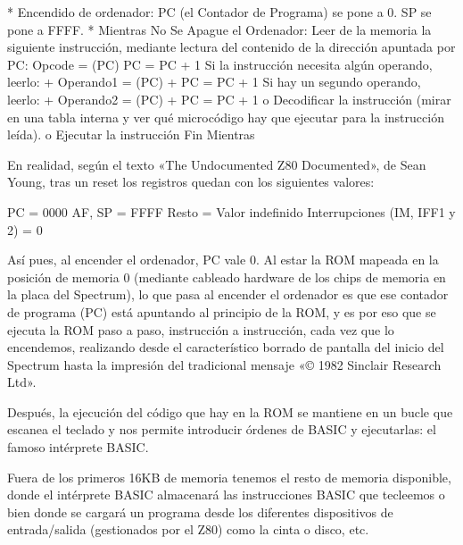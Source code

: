 \documentclass[letterpaper,10pt,spanish]{sphinxmanual}
\begin{document}
\begin{sphinxVerbatim}[commandchars=\\\{\}]
* Encendido de ordenador:
    \PYGZhy{} PC (el Contador de Programa) se pone a 0.
    \PYGZhy{} SP se pone a \PYGZdl{}FFFF.
* Mientras No Se Apague el Ordenador:
    Leer de la memoria la siguiente instrucción, mediante
    lectura del contenido de la dirección apuntada por PC:
    \PYGZhy{} Opcode = (PC)
    \PYGZhy{} PC = PC + 1
    \PYGZhy{} Si la instrucción necesita algún operando, leerlo:
        + Operando1 = (PC)
        + PC = PC + 1
    \PYGZhy{} Si hay un segundo operando, leerlo:
        + Operando2 = (PC)
        + PC = PC + 1
    o Decodificar la instrucción (mirar en una tabla interna y ver
    qué microcódigo hay que ejecutar para la instrucción leída).
    o Ejecutar la instrucción
Fin Mientras
\end{sphinxVerbatim}

En realidad, según el texto «The Undocumented Z80 Documented», de Sean Young, tras un reset los registros quedan con los siguientes valores:

\begin{sphinxVerbatim}[commandchars=\\\{\}]
PC              = \PYGZdl{}0000
AF, SP          = \PYGZdl{}FFFF
Resto           = Valor indefinido
Interrupciones
(IM, IFF1 y 2)  = 0
\end{sphinxVerbatim}

Así pues, al encender el ordenador, PC vale 0. Al estar la ROM mapeada en la posición de memoria 0 (mediante cableado hardware de los chips de memoria en la placa del Spectrum), lo que pasa al encender el ordenador es que ese contador de programa (PC) está apuntando al principio de la ROM, y es por eso que se ejecuta la ROM paso a paso, instrucción a instrucción, cada vez que lo encendemos, realizando desde el característico borrado de pantalla del inicio del Spectrum hasta la impresión del tradicional mensaje «© 1982 Sinclair Research Ltd».

Después, la ejecución del código que hay en la ROM se mantiene en un bucle que escanea el teclado y nos permite introducir órdenes de BASIC y ejecutarlas: el famoso intérprete BASIC.

Fuera de los primeros 16KB de memoria tenemos el resto de memoria disponible, donde el intérprete BASIC almacenará las instrucciones BASIC que tecleemos o bien donde se cargará un programa desde los diferentes dispositivos de entrada/salida (gestionados por el Z80) como la cinta o disco, etc.
\end{document}
